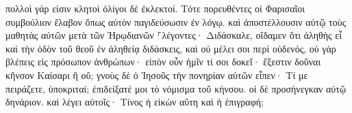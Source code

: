 \documentclass{openreader}
\begin{document}
πολλοὶ γάρ εἰσιν κλητοὶ ὀλίγοι δὲ ἐκλεκτοί. 
Τότε πορευθέντες οἱ Φαρισαῖοι συμβούλιον ἔλαβον ὅπως αὐτὸν παγιδεύσωσιν ἐν λόγῳ. 
καὶ ἀποστέλλουσιν αὐτῷ τοὺς μαθητὰς αὐτῶν μετὰ τῶν Ἡρῳδιανῶν ⸀λέγοντες· Διδάσκαλε, οἴδαμεν ὅτι ἀληθὴς εἶ καὶ τὴν ὁδὸν τοῦ θεοῦ ἐν ἀληθείᾳ διδάσκεις, καὶ οὐ μέλει σοι περὶ οὐδενός, οὐ γὰρ βλέπεις εἰς πρόσωπον ἀνθρώπων· 
εἰπὸν οὖν ἡμῖν τί σοι δοκεῖ· ἔξεστιν δοῦναι κῆνσον Καίσαρι ἢ οὔ; 
γνοὺς δὲ ὁ Ἰησοῦς τὴν πονηρίαν αὐτῶν εἶπεν· Τί με πειράζετε, ὑποκριταί; 
ἐπιδείξατέ μοι τὸ νόμισμα τοῦ κήνσου. οἱ δὲ προσήνεγκαν αὐτῷ δηνάριον. 
καὶ λέγει αὐτοῖς· Τίνος ἡ εἰκὼν αὕτη καὶ ἡ ἐπιγραφή; 
\end{document}
